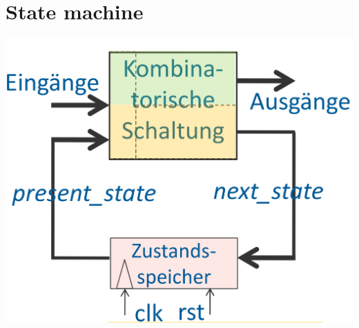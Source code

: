 \section{State machine}
    \begin{minipage}[t]{1\columnwidth}
        \vspace{0pt} %
        \includegraphics[width=\linewidth]{Images/FSMGeneralizzata.png}
    \end{minipage}%